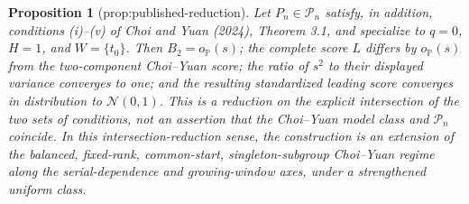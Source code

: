 \documentclass{article}
\newtheorem{proposition}{Proposition}
\begin{document}
\begin{proposition}[prop:published-reduction]\label{prop:published-reduction}
Let \(P_n\in\mathcal P_n\) satisfy, in addition, conditions (i)--(v) of Choi and Yuan (2024), Theorem 3.1, and specialize to \(q=0\), \(H=1\), and \(W=\{t_0\}\). Then \(B_2=o_{\mathbb P}(s)\); the complete score \(L\) differs by \(o_{\mathbb P}(s)\) from the two-component Choi--Yuan score; the ratio of \(s^2\) to their displayed variance converges to one; and the resulting standardized leading score converges in distribution to \(\mathcal N(0,1)\). This is a reduction on the explicit intersection of the two sets of conditions, not an assertion that the Choi--Yuan model class and \(\mathcal P_n\) coincide. In this intersection-reduction sense, the construction is an extension of the balanced, fixed-rank, common-start, singleton-subgroup Choi--Yuan regime along the serial-dependence and growing-window axes, under a strengthened uniform class.
\end{proposition}
\end{document}
